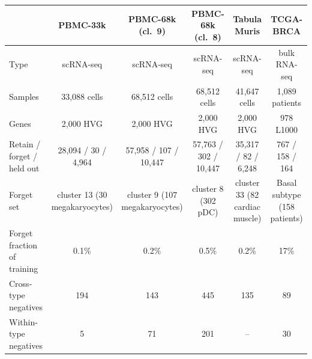 \begin{tabular}{lccccc}
\toprule
 & PBMC-33k & PBMC-68k (cl.\ 9) & PBMC-68k (cl.\ 8) & Tabula Muris & TCGA-BRCA \\
\midrule
Type & scRNA-seq & scRNA-seq & scRNA-seq & scRNA-seq & bulk RNA-seq \\
Samples & 33,088 cells & 68,512 cells & 68,512 cells & 41,647 cells & 1,089 patients \\
Genes & 2,000 HVG & 2,000 HVG & 2,000 HVG & 2,000 HVG & 978 L1000 \\
Retain / forget / held out & 28,094 / 30 / 4,964 & 57,958 / 107 / 10,447 & 57,763 / 302 / 10,447 & 35,317 / 82 / 6,248 & 767 / 158 / 164 \\
Forget set & cluster 13 (30 megakaryocytes) & cluster 9 (107 megakaryocytes) & cluster 8 (302 pDC) & cluster 33 (82 cardiac muscle) & Basal subtype (158 patients) \\
Forget fraction of training & 0.1\% & 0.2\% & 0.5\% & 0.2\% & 17\% \\
Cross-type negatives & 194 & 143 & 445 & 135 & 89 \\
Within-type negatives & 5 & 71 & 201 & -- & 30 \\
\bottomrule
\end{tabular}
